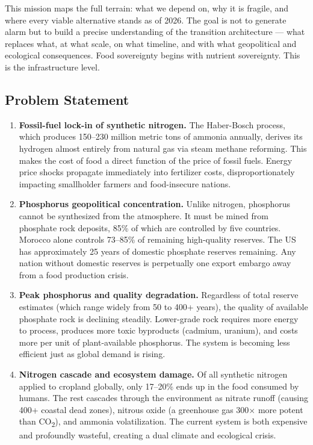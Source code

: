 \documentclass[11pt,letterpaper]{article}
\begin{document}
This mission maps the full terrain: what we depend on, why it is fragile, and where every viable alternative stands as of 2026. The goal is not to generate alarm but to build a precise understanding of the transition architecture --- what replaces what, at what scale, on what timeline, and with what geopolitical and ecological consequences. Food sovereignty begins with nutrient sovereignty. This is the infrastructure level.

\subsection{Problem Statement}

\begin{enumerate}[leftmargin=1.5em]

\item \textbf{Fossil-fuel lock-in of synthetic nitrogen.} The Haber-Bosch process, which produces 150--230 million metric tons of ammonia annually, derives its hydrogen almost entirely from natural gas via steam methane reforming. This makes the cost of food a direct function of the price of fossil fuels. Energy price shocks propagate immediately into fertilizer costs, disproportionately impacting smallholder farmers and food-insecure nations.

\item \textbf{Phosphorus geopolitical concentration.} Unlike nitrogen, phosphorus cannot be synthesized from the atmosphere. It must be mined from phosphate rock deposits, 85\% of which are controlled by five countries. Morocco alone controls 73--85\% of remaining high-quality reserves. The US has approximately 25 years of domestic phosphate reserves remaining. Any nation without domestic reserves is perpetually one export embargo away from a food production crisis.

\item \textbf{Peak phosphorus and quality degradation.} Regardless of total reserve estimates (which range widely from 50 to 400+ years), the quality of available phosphate rock is declining steadily. Lower-grade rock requires more energy to process, produces more toxic byproducts (cadmium, uranium), and costs more per unit of plant-available phosphorus. The system is becoming less efficient just as global demand is rising.

\item \textbf{Nitrogen cascade and ecosystem damage.} Of all synthetic nitrogen applied to cropland globally, only 17--20\% ends up in the food consumed by humans. The rest cascades through the environment as nitrate runoff (causing 400+ coastal dead zones), nitrous oxide (a greenhouse gas 300$\times$ more potent than CO\textsubscript{2}), and ammonia volatilization. The current system is both expensive and profoundly wasteful, creating a dual climate and ecological crisis.


\end{enumerate}
\end{document}
